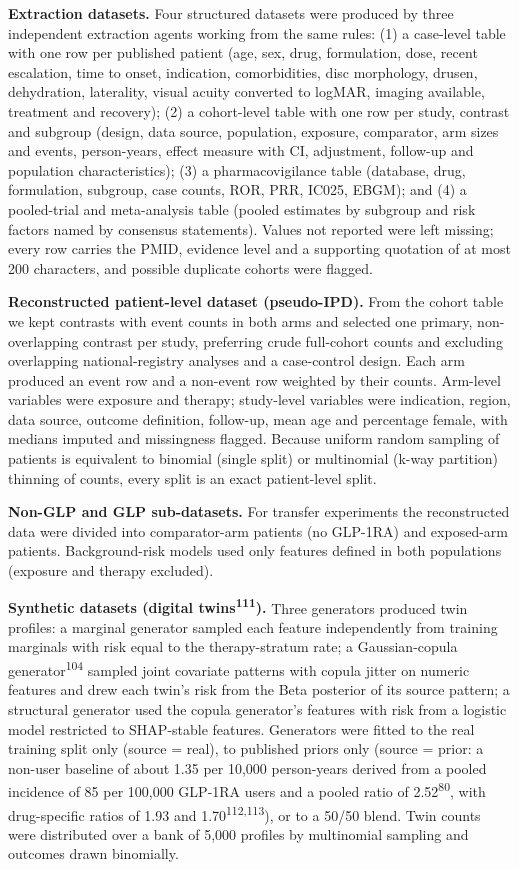 \documentclass[
  11pt,
]{article}
\begin{document}
\textbf{Extraction datasets.} Four structured datasets were produced by
three independent extraction agents working from the same rules: (1) a
case-level table with one row per published patient (age, sex, drug,
formulation, dose, recent escalation, time to onset, indication,
comorbidities, disc morphology, drusen, dehydration, laterality, visual
acuity converted to logMAR, imaging available, treatment and recovery);
(2) a cohort-level table with one row per study, contrast and subgroup
(design, data source, population, exposure, comparator, arm sizes and
events, person-years, effect measure with CI, adjustment, follow-up and
population characteristics); (3) a pharmacovigilance table (database,
drug, formulation, subgroup, case counts, ROR, PRR, IC025, EBGM); and
(4) a pooled-trial and meta-analysis table (pooled estimates by subgroup
and risk factors named by consensus statements). Values not reported
were left missing; every row carries the PMID, evidence level and a
supporting quotation of at most 200 characters, and possible duplicate
cohorts were flagged.

\textbf{Reconstructed patient-level dataset (pseudo-IPD).} From the
cohort table we kept contrasts with event counts in both arms and
selected one primary, non-overlapping contrast per study, preferring
crude full-cohort counts and excluding overlapping national-registry
analyses and a case-control design. Each arm produced an event row and a
non-event row weighted by their counts. Arm-level variables were
exposure and therapy; study-level variables were indication, region,
data source, outcome definition, follow-up, mean age and percentage
female, with medians imputed and missingness flagged. Because uniform
random sampling of patients is equivalent to binomial (single split) or
multinomial (k-way partition) thinning of counts, every split is an
exact patient-level split.

\textbf{Non-GLP and GLP sub-datasets.} For transfer experiments the
reconstructed data were divided into comparator-arm patients (no
GLP-1RA) and exposed-arm patients. Background-risk models used only
features defined in both populations (exposure and therapy excluded).

\textbf{Synthetic datasets (digital twins\textsuperscript{111}).} Three
generators produced twin profiles: a marginal generator sampled each
feature independently from training marginals with risk equal to the
therapy-stratum rate; a Gaussian-copula generator\textsuperscript{104}
sampled joint covariate patterns with copula jitter on numeric features
and drew each twin's risk from the Beta posterior of its source pattern;
a structural generator used the copula generator's features with risk
from a logistic model restricted to SHAP-stable features. Generators
were fitted to the real training split only (source = real), to
published priors only (source = prior: a non-user baseline of about 1.35
per 10,000 person-years derived from a pooled incidence of 85 per
100,000 GLP-1RA users and a pooled ratio of 2.52\textsuperscript{80},
with drug-specific ratios of 1.93 and 1.70\textsuperscript{112,113}), or
to a 50/50 blend. Twin counts were distributed over a bank of 5,000
profiles by multinomial sampling and outcomes drawn binomially.
\end{document}
